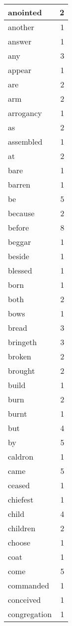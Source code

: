 \begin{center}
\begin{longtable}{l|r}
anointed & 2 \\ \hline
another & 1 \\ \hline
answer & 1 \\ \hline
any & 3 \\ \hline
appear & 1 \\ \hline
are & 2 \\ \hline
arm & 2 \\ \hline
arrogancy & 1 \\ \hline
as & 2 \\ \hline
assembled & 1 \\ \hline
at & 2 \\ \hline
bare & 1 \\ \hline
barren & 1 \\ \hline
be & 5 \\ \hline
because & 2 \\ \hline
before & 8 \\ \hline
beggar & 1 \\ \hline
beside & 1 \\ \hline
blessed & 1 \\ \hline
born & 1 \\ \hline
both & 2 \\ \hline
bows & 1 \\ \hline
bread & 3 \\ \hline
bringeth & 3 \\ \hline
broken & 2 \\ \hline
brought & 2 \\ \hline
build & 1 \\ \hline
burn & 2 \\ \hline
burnt & 1 \\ \hline
but & 4 \\ \hline
by & 5 \\ \hline
caldron & 1 \\ \hline
came & 5 \\ \hline
ceased & 1 \\ \hline
chiefest & 1 \\ \hline
child & 4 \\ \hline
children & 2 \\ \hline
choose & 1 \\ \hline
coat & 1 \\ \hline
come & 5 \\ \hline
commanded & 1 \\ \hline
conceived & 1 \\ \hline
congregation & 1 \\ \hline

\end{longtable}
\end{center}
